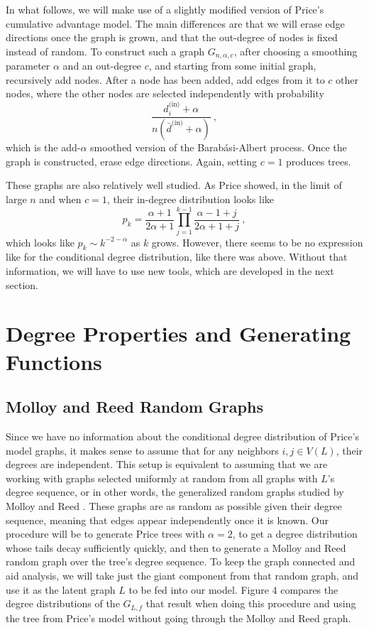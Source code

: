 \documentclass[12pt]{article}
\begin{document}
In what follows, we will make use of a slightly modified version of
Price's cumulative advantage model. The main differences are that we
will erase edge directions once the graph is grown, and that the out-degree
of nodes is fixed instead of random. To construct such a graph $G_{n,\alpha,c}$,
after choosing a smoothing parameter $\alpha$ and an out-degree $c$, and
starting from some initial graph, recursively add nodes. After a node has been
added, add edges from it to $c$ other nodes, where the other nodes
are selected independently with probability
\[
\frac{d^{\text{(in)}}_i + \alpha}{n(\bar{d}^\text{(in)} + \alpha)}\ ,
\]
which is the add-$\alpha$ smoothed version of the Barab{\'a}si-Albert
process. Once the graph is constructed, erase edge directions. Again,
setting $c=1$ produces trees.\par

These graphs are also relatively well studied. As Price showed,
in the limit of large $n$ and when $c=1$, their in-degree distribution
looks like
\[
p_k = \frac{\alpha + 1}{2\alpha + 1}\prod_{j=1}^{k-1}\frac{\alpha - 1 + j}{2\alpha + 1 + j}\ ,
\]
which looks like $p_k \sim k^{-2-\alpha}$ as $k$ grows. However,
there seems to be no expression like for the conditional degree
distribution, like there was above. Without that information,
we will have to use new tools, which are developed in the next section.


\section{\textbf{\textsf{Degree Properties and Generating Functions}}}

\subsection{\textbf{\textsf{Molloy and Reed Random Graphs}}}

Since we have no information about the conditional degree distribution of Price's model
graphs, it makes sense to assume that for any neighbors $i,j\in V(L)$, their degrees
are independent. This setup is equivalent to assuming that we are working with
graphs selected uniformly at random from all graphs with $L$'s degree sequence,
or in other words, the generalized random graphs studied by Molloy and Reed \cite{molloy95,molloy98}.
These graphs are as random as possible given their degree sequence, meaning that
edges appear independently once it is known. Our procedure will be to generate
Price trees with $\alpha=2$, to get a degree distribution whose tails decay
sufficiently quickly, and then to generate a Molloy and Reed random graph
over the tree's degree sequence. To keep the graph connected and aid analysis,
we will take just the giant component from that random graph, and use it
as the latent graph $L$ to be fed into our model. Figure 4 compares the
degree distributions of the $G_{L,f}$ that result when doing this procedure
and using the tree from Price's model without going through the Molloy and
Reed graph.
\end{document}
